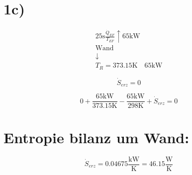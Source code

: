 

\section*{1c)}

\[
\begin{array}{c}
\text{25s} \frac{\dot{Q}_{EF}}{T_{EF}} \uparrow 65 \text{kW} \\
\text{Wand} \\
\downarrow \\
T_R = 373.15 \text{K} \quad 65 \text{kW}
\end{array}
\]

\[
\dot{S}_{erz} = 0
\]

\[
0 + \frac{65 \text{kW}}{373.15 \text{K}} - \frac{65 \text{kW}}{298 \text{K}} + \dot{S}_{erz} = 0
\]

\section*{Entropie bilanz um Wand:}

\[
\dot{S}_{erz} = 0.04675 \frac{\text{kW}}{\text{K}} = 46.15 \frac{\text{W}}{\text{K}}
\]